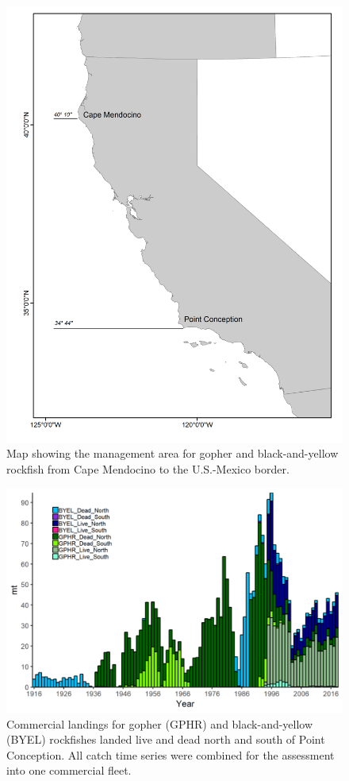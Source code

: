 \documentclass[12pt,]{article}
\begin{document}
\begin{figure}
\centering
\includegraphics{Figures/assess_region_map.png}
\caption{Map showing the management area for gopher and black-and-yellow
rockfish from Cape Mendocino to the U.S.-Mexico border.
\label{fig:assess_region_map1}}
\end{figure}

\begin{figure}
\centering
\includegraphics{Figures/Catches_livedeadNS_gby.png}
\caption{Commercial landings for gopher (GPHR) and black-and-yellow
(BYEL) rockfishes landed live and dead north and south of Point
Conception. All catch time series were combined for the assessment into
one commercial fleet. \label{fig:Catches_livedeadNS_gby}}
\end{figure}
\end{document}

